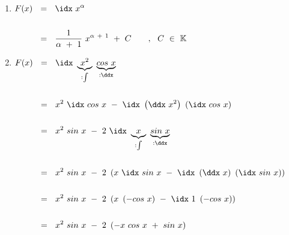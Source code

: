 \section{~}

~\\


\begin{enumerate}[leftmargin=*, labelsep=3em, itemsep=3em]
	
	\item $\begin{aligned}[t]
	F(x) ~~ &= ~~ \idx ~ x^{\alpha} \\ \\
	&= ~~ \frac{1}{\alpha ~ + ~ 1} ~ x^{\alpha ~ + ~ 1} ~ + ~ C \qquad, ~~ C ~ \in ~ \mathbb{K}
	\end{aligned}$
	
	\item $\begin{aligned}[t]
	F(x) ~~ &= ~~ \idx ~ \underbrace{x^2}_{:\int} ~ \underbrace{cos ~ x}_{:\ddx} \\ \\
	&= ~~ x^2 ~ \idx ~ cos ~ x ~ - ~ \idx ~ \left( \ddx ~ x^2 \right) ~ \left( \idx ~ cos ~ x \right) \\ \\
	&= ~~ x^2 ~ sin ~ x ~ - ~ 2 ~ \idx ~ \underbrace{x}_{:\int} ~ \underbrace{sin ~ x}_{:\ddx} \\ \\
	&= ~~ x^2 ~ sin ~ x ~ - ~ 2 ~ \left( x ~ \idx ~ sin ~ x ~ - ~ \idx ~ \left( \ddx ~ x \right) ~ \left( \idx ~ sin ~ x \right) \right) \\ \\
	&= ~~ x^2 ~ sin ~ x ~ - ~ 2 ~ \left( x ~ \left( - cos ~ x \right) ~ - ~ \idx ~ 1 ~ \left( - cos ~ x \right) \right) \\ \\
	&= ~~ x^2 ~ sin ~ x ~ - ~ 2 ~ \left( - x ~ cos ~ x ~ + ~ sin ~ x \right)
	\end{aligned}$

\end{enumerate}
	
	

\newpage
	

